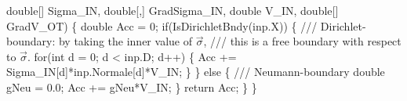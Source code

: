 {\btab \btab double[] Sigma\_IN, double[,] GradSigma\_IN, double V\_IN, double[] GradV\_OT) \{ \newline 
 \newline 
\btab \btab double Acc = 0; \newline 
 \newline 
\btab \btab if(IsDirichletBndy(inp.X)) \{ \newline 
            /// Dirichlet-boundary: by taking the inner value of $\vec{\sigma}$, 
            /// this is a free boundary with respect to $\vec{\sigma}$.
\btab \btab \btab for(int d = 0; d < inp.D; d++) \{ \newline 
\btab \btab \btab \btab Acc += Sigma\_IN[d]*inp.Normale[d]*V\_IN; \newline 
\btab \btab \btab \} \newline 
\btab \btab \} else \{ \newline 
            /// Neumann-boundary
\btab \btab \btab double gNeu = 0.0; \newline 
\btab \btab \btab Acc += gNeu*V\_IN; \newline 
\btab \btab \} \newline 
\btab \btab return Acc; \newline 
\btab \} \newline 
\}
 }
\BoSSSexe
